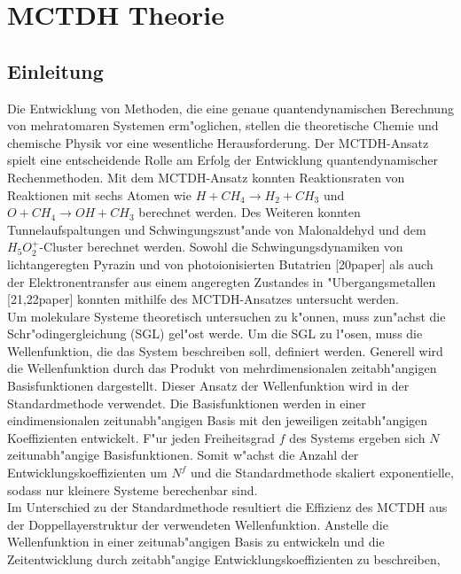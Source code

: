 \chapter{MCTDH Theorie}

\section{Einleitung}
Die Entwicklung von Methoden, die eine genaue quantendynamischen Berechnung von mehratomaren Systemen erm"oglichen, stellen die theoretische Chemie und
chemische Physik vor eine wesentliche Herausforderung.
Der MCTDH-Ansatz \cite{MMC, MMC1} spielt eine entscheidende Rolle am Erfolg der Entwicklung quantendynamischer Rechenmethoden.
Mit dem MCTDH-Ansatz konnten Reaktionsraten von Reaktionen mit sechs Atomen wie $H+CH_{4} \rightarrow H_{2} + CH_{3}$  \cite{HM1, HM2, HM4, WWM, WWM2}
und $ O + CH_{4} \rightarrow OH + CH_{3} $ \cite{HM5} berechnet werden.
Des Weiteren konnten Tunnelaufspaltungen und Schwingungszust"ande von Malonaldehyd \cite{CVM} und dem $ H_{5}O^{+}_{2} $-Cluster \cite{H5O2+MCTDH, H5O2+MCTDH2, H5O2+MCTDH3} berechnet werden.
Sowohl die Schwingungsdynamiken von lichtangeregten Pyrazin \cite{RWMC} und von photoionisierten Butatrien \cite{CWMC} [20paper] als auch der Elektronentransfer
aus einem angeregten Zustandes in "Ubergangsmetallen \cite{WT, WT2} [21,22paper]  konnten mithilfe des MCTDH-Ansatzes untersucht werden.
\\Um molekulare Systeme theoretisch untersuchen zu k"onnen, muss zun"achst die Schr"odingergleichung (SGL) gel"ost werde.
Um die SGL zu l"osen, muss die Wellenfunktion, die das System beschreiben soll, definiert werden.
Generell wird die Wellenfunktion durch das Produkt von mehrdimensionalen zeitabh"angigen Basisfunktionen dargestellt.
Dieser Ansatz der Wellenfunktion wird in der Standardmethode verwendet. \cite{MCTDHreview3}
 Die Basisfunktionen werden in einer eindimensionalen zeitunabh"angigen Basis mit den jeweiligen zeitabh"angigen Koeffizienten entwickelt.
F"ur jeden Freiheitsgrad $f$ des Systems ergeben sich $N$ zeitunabh"angige Basisfunktionen. Somit w"achst die Anzahl der Entwicklungskoeffizienten um $N^{f}$ und
die Standardmethode skaliert exponentielle, sodass nur kleinere Systeme berechenbar sind. \cite{MCTDHreview3}
  \\ Im Unterschied zu der Standardmethode resultiert die Effizienz des MCTDH aus der Doppellayerstruktur der verwendeten Wellenfunktion.
Anstelle die Wellenfunktion in einer zeitunab"angigen Basis zu entwickeln und die Zeitentwicklung durch zeitabh"angige Entwicklungskoeffizienten zu beschreiben,
